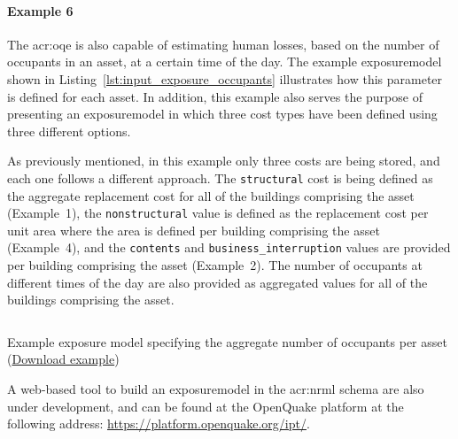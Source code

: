 \paragraph{Example 6}

The \glsdesc{acr:oqe} is also capable of estimating human losses, based on the
number of occupants in an \gls{asset}, at a certain time of the day. The example
\gls{exposuremodel} shown in Listing~\ref{lst:input_exposure_occupants} illustrates
how this parameter is defined for each \gls{asset}. In addition, this example also
serves the purpose of presenting an \gls{exposuremodel} in which three cost
types have been defined using three different options.

As previously mentioned, in this example only three costs are being stored,
and each one follows a different approach. The \Verb+structural+ cost is being
defined as the aggregate replacement cost for all of the buildings comprising
the asset (Example~1), the \Verb+nonstructural+ value is defined as the
replacement cost per unit area where the area is defined per building
comprising the \gls{asset} (Example~4), and the \Verb+contents+ and
\Verb+business_interruption+ values are provided per building comprising the
\gls{asset} (Example~2). The number of occupants at different times of the day are
also provided as aggregated values for all of the buildings comprising the
\gls{asset}.

\begin{listing}[htbp]
  \inputminted[firstline=1,firstnumber=1,fontsize=\footnotesize,frame=single,linenos,bgcolor=lightgray]{xml}{oqum/risk/verbatim/input_exposure_occupants.xml}
  \caption{Example exposure model specifying the aggregate number of occupants per asset (\href{https://raw.githubusercontent.com/GEMScienceTools/oq-engine-docs/master/oqum/risk/verbatim/input_exposure_occupants.xml}{Download example})}
  \label{lst:input_exposure_occupants}
\end{listing}


A web-based tool to build an \gls{exposuremodel} in the \gls{acr:nrml} schema
are also under development, and can be found at the OpenQuake platform at the
following address: \href{https://platform.openquake.org/ipt/}{https://platform.openquake.org/ipt/}.

